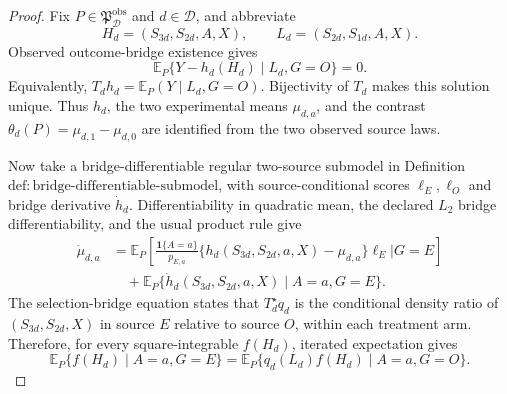 \documentclass{article}
\begin{document}
\begin{proof}
Fix \(P\in\mathfrak P_{\mathcal D}^{\mathrm{obs}}\) and \(d\in\mathcal D\), and abbreviate
\[
 H_d=(S_{3d},S_{2d},A,X),\qquad L_d=(S_{2d},S_{1d},A,X).
\]
Observed outcome-bridge existence gives
\[
 \mathbb E_P\{Y-h_d(H_d)\mid L_d,G=O\}=0. \tag{1}
\]
Equivalently, \(T_dh_d=\mathbb E_P(Y\mid L_d,G=O)\).  Bijectivity of \(T_d\) makes this solution unique.  Thus \(h_d\), the two experimental means \(\mu_{d,a}\), and the contrast \(\theta_d(P)=\mu_{d,1}-\mu_{d,0}\) are identified from the two observed source laws.

Now take a bridge-differentiable regular two-source submodel in Definition~\(\mathrm{def{:}bridge\text{-}differentiable\text{-}submodel}\), with source-conditional scores \(\ell_E,\ell_O\) and bridge derivative \(\dot h_d\).  Differentiability in quadratic mean, the declared \(L_2\) bridge differentiability, and the usual product rule give
\[
\begin{aligned}
 \dot\mu_{d,a}
 &={\mathbb E}_P\!\left[
   \frac{\mathbf 1\{A=a\}}{p_{E,a}}
   \{h_d(S_{3d},S_{2d},a,X)-\mu_{d,a}\}\ell_E
   \mathrel{\Big|}G=E\right]\\
 &\quad+{\mathbb E}_P\{\dot h_d(S_{3d},S_{2d},a,X)\mid A=a,G=E\}. \tag{2}
\end{aligned}
\]
The selection-bridge equation states that \(T_d^\star q_d\) is the conditional density ratio of \((S_{3d},S_{2d},X)\) in source \(E\) relative to source \(O\), within each treatment arm.  Therefore, for every square-integrable \(f(H_d)\), iterated expectation gives
\[
 {\mathbb E}_P\{f(H_d)\mid A=a,G=E\}
 ={\mathbb E}_P\{q_d(L_d)f(H_d)\mid A=a,G=O\}. \tag{3}
\]


\end{proof}
\end{document}
